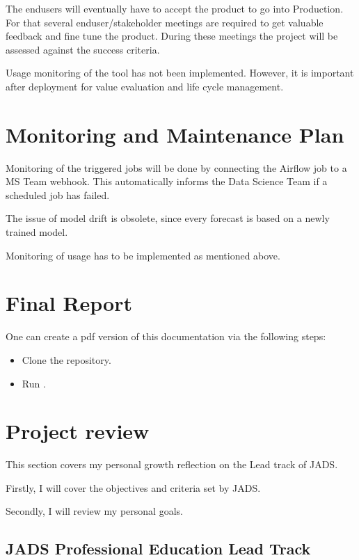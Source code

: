 \documentclass[letterpaper,10pt,english]{sphinxmanual}
\begin{document}
The end\sphinxhyphen{}users will eventually have to accept the product to go into Production.
For that several end\sphinxhyphen{}user/stakeholder meetings are required to get valuable feedback and fine tune the product.
During these meetings the project will be assessed against the success criteria.

Usage monitoring of the tool has not been implemented.
However, it is important after deployment for value evaluation and life cycle management.


\section{Monitoring and Maintenance Plan}
\label{\detokenize{deployment:monitoring-and-maintenance-plan}}
Monitoring of the triggered jobs will be done by connecting the Airflow job to a MS Team webhook.
This automatically informs the Data Science Team if a scheduled job has failed.

The issue of model drift is obsolete, since every forecast is based on a newly trained model.

Monitoring of usage has to be implemented as mentioned above.


\section{Final Report}
\label{\detokenize{deployment:final-report}}
One can create a pdf version of this documentation via the following steps:
\begin{itemize}
\item {} 
Clone the repository.

\item {} 
Run .

\end{itemize}


\section{Project review}
\label{\detokenize{deployment:project-review}}
This section covers my personal growth reflection on the Lead track of JADS.

Firstly, I will cover the objectives and criteria set by JADS.

Secondly, I will review my personal goals.


\subsection{JADS \sphinxhyphen{} Professional Education \sphinxhyphen{} Lead Track}
\label{\detokenize{deployment:jads-professional-education-lead-track}}
\end{document}
